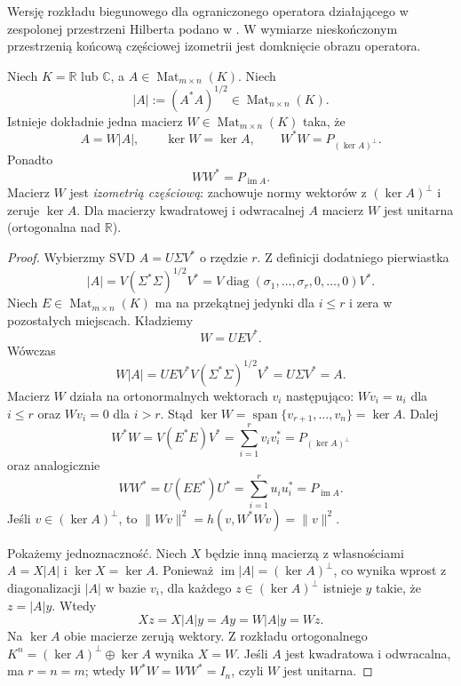 Wersję rozkładu biegunowego dla ograniczonego operatora działającego w zespolonej przestrzeni Hilberta podano w . W wymiarze nieskończonym przestrzenią końcową częściowej izometrii jest domknięcie obrazu operatora.

\begin{twierdzenie}
\label{thm:lin15-polar}
Niech \(K=\mathbb R\) lub \(\mathbb C\),
a \(A\in\operatorname{Mat}_{m\times n}(K)\).
Niech
\[
 |A|:=(A^*A)^{1/2}
 \in\operatorname{Mat}_{n\times n}(K).
\]
Istnieje dokładnie jedna macierz
\(W\in\operatorname{Mat}_{m\times n}(K)\)
taka, że
\[
 A=W|A|,\qquad
 \ker W=\ker A,\qquad
 W^*W=P_{(\ker A)^\perp}.
\]
Ponadto
\[
 WW^*=P_{\operatorname{im}A}.
\]
Macierz \(W\) jest
\emph{izometrią częściową}:
zachowuje normy wektorów
z \((\ker A)^\perp\)
i zeruje \(\ker A\).
Dla macierzy kwadratowej
i odwracalnej \(A\)
macierz \(W\) jest unitarna
(ortogonalna nad \(\mathbb R\)).
\end{twierdzenie}
\begin{proof}
Wybierzmy SVD
\(A=U\Sigma V^*\)
o rzędzie \(r\).
Z definicji dodatniego
pierwiastka
\[
 |A|=V(\Sigma^*\Sigma)^{1/2}V^*
 =V\operatorname{diag}
  (\sigma_1,\ldots,\sigma_r,0,\ldots,0)V^*.
\]
Niech \(E\in\operatorname{Mat}_{m\times n}(K)\)
ma na przekątnej jedynki
dla \(i\le r\) i zera
w pozostałych miejscach.
Kładziemy
\[
 W=UEV^*.
\]
Wówczas
\[
 W|A|
 =UEV^*V(\Sigma^*\Sigma)^{1/2}V^*
 =U\Sigma V^*=A.
\]
Macierz \(W\) działa
na ortonormalnych wektorach
\(v_i\) następująco:
\(Wv_i=u_i\) dla \(i\le r\)
oraz \(Wv_i=0\) dla \(i>r\).
Stąd
\(\ker W=\operatorname{span}\{v_{r+1},\ldots,v_n\}
=\ker A\).
Dalej
\[
 W^*W
 =V(E^*E)V^*
 =\sum_{i=1}^r v_iv_i^*
 =P_{(\ker A)^\perp}
\]
oraz analogicznie
\[
 WW^*=U(EE^*)U^*
 =\sum_{i=1}^r u_iu_i^*
 =P_{\operatorname{im}A}.
\]
Jeśli \(v\in(\ker A)^\perp\),
to
\(\|Wv\|^2=h(v,W^*Wv)=\|v\|^2\).

Pokażemy jednoznaczność.
Niech \(X\) będzie inną
macierzą z własnościami
\(A=X|A|\) i
\(\ker X=\ker A\).
Ponieważ
\(\operatorname{im}|A|
=(\ker A)^\perp\),
co wynika wprost z
diagonalizacji \(|A|\)
w bazie \(v_i\), dla
każdego \(z\in(\ker A)^\perp\)
istnieje \(y\) takie, że
\(z=|A|y\).
Wtedy
\[
 Xz=X|A|y=Ay=W|A|y=Wz.
\]
Na \(\ker A\) obie macierze
zerują wektory.
Z rozkładu ortogonalnego
\(K^n=(\ker A)^\perp\oplus\ker A\)
wynika \(X=W\).
Jeśli \(A\) jest kwadratowa
i odwracalna, ma \(r=n=m\);
wtedy \(W^*W=WW^*=I_n\),
czyli \(W\) jest unitarna.
\end{proof}

